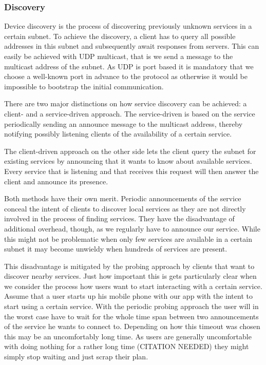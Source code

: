 
\subsubsection{Discovery}

Device discovery is the process of discovering previously unknown services in a certain subnet.
To achieve the discovery, a client has to query all possible addresses in this subnet and subsequently await responses from servers.
This can easily be achieved with UDP multicast, that is we send a message to the multicast address of the subnet.
As UDP is port based it is mandatory that we choose a well-known port in advance to the protocol as otherwise it would be impossible to bootstrap the initial communication.

There are two major distinctions on how service discovery can be achieved: a client- and a service-driven approach.
The service-driven is based on the service periodically sending an announce message to the multicast address, thereby notifying possibly listening clients of the availability of a certain service.

The client-driven approach on the other side lets the client query the subnet for existing services by announcing that it wants to know about available services.
Every service that is listening and that receives this request will then answer the client and announce its presence.

Both methods have their own merit.
Periodic announcements of the service conceal the intent of clients to discover local services as they are not directly involved in the process of finding services.
They have the disadvantage of additional overhead, though, as we regularly have to announce our service.
While this might not be problematic when only few services are available in a certain subnet it may become unwieldy when hundreds of services are present.

This disadvantage is mitigated by the probing approach by clients that want to discover nearby services.
Just how important this is gets particularly clear when we consider the process how users want to start interacting with a certain service.
Assume that a user starts up his mobile phone with our app with the intent to start using a certain service.
With the periodic probing approach the user will in the worst case have to wait for the whole time span between two announcements of the service he wants to connect to.
Depending on how this timeout was chosen this may be an uncomfortably long time.
As users are generally uncomfortable with doing nothing for a rather long time (CITATION NEEDED) they might simply stop waiting and just scrap their plan.

